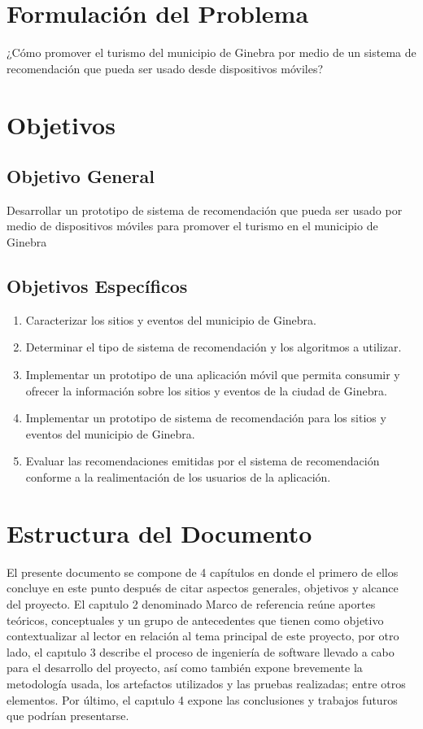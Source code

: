 \documentclass[12pt,letterpaper,openany]{book}
\begin{document}
\section{Formulación del Problema}
¿Cómo promover el turismo del municipio de Ginebra por medio de un sistema de recomendación que pueda ser usado desde dispositivos móviles?

\section{Objetivos}
\subsection{Objetivo General}
Desarrollar un prototipo de sistema de recomendación que pueda ser usado por medio de dispositivos móviles para promover el turismo en el municipio de Ginebra
\subsection{Objetivos Específicos}
\begin{enumerate}
    \item Caracterizar los sitios y eventos del municipio de Ginebra.
    \item Determinar el tipo de sistema de recomendación y los algoritmos a utilizar.
    \item Implementar un prototipo de una aplicación móvil que permita consumir y ofrecer la información sobre los sitios y eventos de la ciudad de Ginebra.
    \item Implementar un prototipo de sistema de recomendación para los sitios y eventos del municipio de Ginebra.
    \item Evaluar las recomendaciones emitidas por el sistema de recomendación conforme a la realimentación de los usuarios de la aplicación.
\end{enumerate}

\section{Estructura del Documento}
El presente documento se compone de 4 capítulos en donde el primero de ellos concluye en este punto después de citar aspectos generales, objetivos y alcance del proyecto. El capıtulo 2 denominado Marco de referencia reúne aportes teóricos, conceptuales y un grupo de antecedentes que tienen como objetivo contextualizar al lector en relación al tema principal de este proyecto, por otro lado, el capıtulo 3 describe el proceso de ingeniería de software llevado a cabo para el desarrollo del proyecto, así como también expone brevemente la metodología usada, los artefactos utilizados y las pruebas realizadas; entre otros elementos. Por último, el capıtulo 4 expone las conclusiones y trabajos futuros que podrían presentarse.
\end{document}
